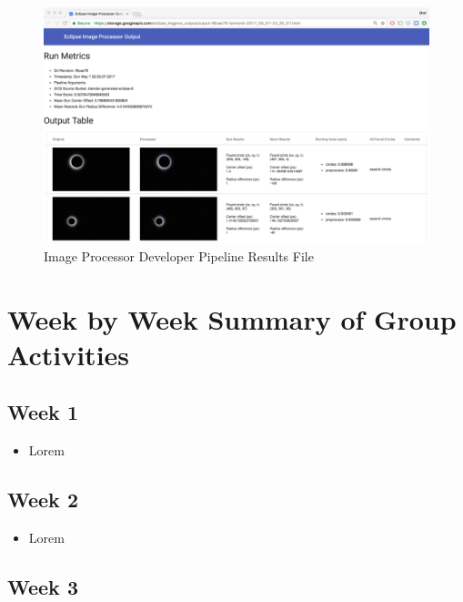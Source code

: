 \documentclass[10pt, onecolumn, draftclsnofoot, letterpaper, compsoc]{IEEEtran}
\begin{document}
\begin{figure}[!h]
    \begin{center}
            \includegraphics[width=\textwidth]{imgproc.eps}
        \caption{Image Processor Developer Pipeline Results File}
    \end{center}
\end{figure}
\newpage


\newpage
\section{Week by Week Summary of Group Activities}

\subsection{Week 1}

    \begin{itemize}

	\item Lorem

    \end{itemize}

\subsection{Week 2}

    \begin{itemize}

	\item Lorem

    \end{itemize}

\subsection{Week 3}
\end{document}
